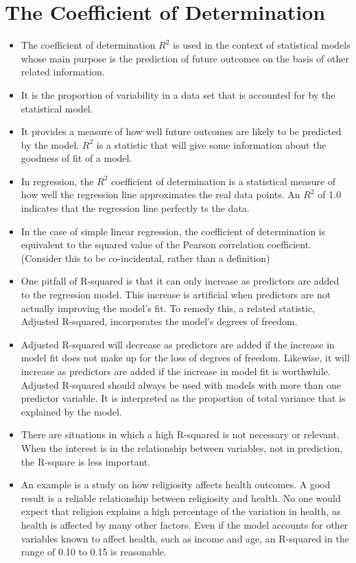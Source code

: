 \documentclass[]{report}
\begin{document}
\section*{The Coefficient of Determination}
\begin{itemize}
	\item 

The coefficient of determination $R^2$ is used in the context of statistical models whose main
purpose is the prediction of future outcomes on the basis of other related information. \item It is the
proportion of variability in a data set that is accounted for by the statistical model. \item It provides
a measure of how well future outcomes are likely to be predicted by the model.
$R^2$ is a statistic that will give some information about the goodness of fit of a model.
\item  In
regression, the $R^2$ coefficient of determination is a statistical measure of how well the regression
line approximates the real data points. An $R^2$ of 1.0 indicates that the regression line perfectly
ts the data.
\item In the case of simple linear regression, the coefficient of determination is equivalent to the
squared value of the Pearson correlation coefficient. (Consider this to be co-incidental, rather
than a definition)
\end{itemize}
\begin{itemize}
\item One pitfall of R-squared is that it can only increase as predictors are added to the regression model. This increase is artificial when predictors are not actually improving the model’s fit. To remedy this, a related statistic, Adjusted R-squared, incorporates the model’s degrees of freedom. 
\item Adjusted R-squared will decrease as predictors are added if the increase in model fit does not make up for the loss of degrees of freedom. Likewise, it will increase as predictors are added if the increase in model fit is worthwhile. Adjusted R-squared should always be used with models with more than one predictor variable. It is interpreted as the proportion of total variance that is explained by the model.
\item 
There are situations in which a high R-squared is not necessary or relevant. When the interest is in the relationship between variables, not in prediction, the R-square is less important. 
\item An example is a study on how religiosity affects health outcomes. A good result is a reliable relationship between religiosity and health. No one would expect that religion explains a high percentage of the variation in health, as health is affected by many other factors. Even if the model accounts for other variables known to affect health, such as income and age, an R-squared in the range of 0.10 to 0.15 is reasonable.
\end{itemize}
\medskip
\end{document}

